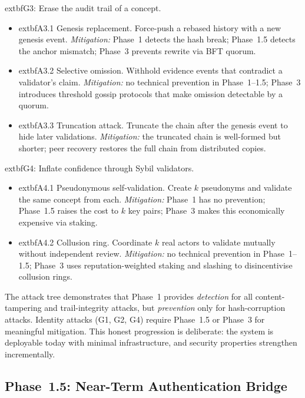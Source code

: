 	extbf{G3: Erase the audit trail of a concept.}
\begin{itemize}[leftmargin=2em]
    \item 	extbf{A3.1 Genesis replacement.} Force-push a rebased history with a new genesis event. \emph{Mitigation:} Phase~1 detects the hash break; Phase~1.5 detects the anchor mismatch; Phase~3 prevents rewrite via BFT quorum.
    \item 	extbf{A3.2 Selective omission.} Withhold evidence events that contradict a validator's claim. \emph{Mitigation:} no technical prevention in Phase~1--1.5; Phase~3 introduces threshold gossip protocols that make omission detectable by a quorum.
    \item 	extbf{A3.3 Truncation attack.} Truncate the chain after the genesis event to hide later validations. \emph{Mitigation:} the truncated chain is well-formed but shorter; peer recovery restores the full chain from distributed copies.
\end{itemize}

	extbf{G4: Inflate confidence through Sybil validators.}
\begin{itemize}[leftmargin=2em]
    \item 	extbf{A4.1 Pseudonymous self-validation.} Create $k$ pseudonyms and validate the same concept from each. \emph{Mitigation:} Phase~1 has no prevention; Phase~1.5 raises the cost to $k$ key pairs; Phase~3 makes this economically expensive via staking.
    \item 	extbf{A4.2 Collusion ring.} Coordinate $k$ real actors to validate mutually without independent review. \emph{Mitigation:} no technical prevention in Phase~1--1.5; Phase~3 uses reputation-weighted staking and slashing to disincentivise collusion rings.
\end{itemize}

The attack tree demonstrates that Phase~1 provides \emph{detection} for all content-tampering and trail-integrity attacks, but \emph{prevention} only for hash-corruption attacks. Identity attacks (G1, G2, G4) require Phase~1.5 or Phase~3 for meaningful mitigation. This honest progression is deliberate: the system is deployable today with minimal infrastructure, and security properties strengthen incrementally.

\subsection{Phase~1.5: Near-Term Authentication Bridge}\label{app:phase-1.5}

